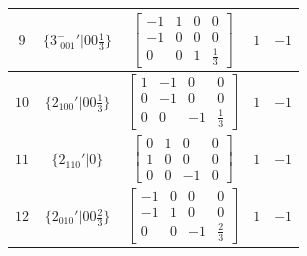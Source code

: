 \documentclass[fleqn,8pt]{jsarticle}
\begin{document}
\begin{longtable}{ccccc}
$ 9 $ & $ \{3^{-}_{\,\,001}{}'|0 0 \frac{1}{3}\} $ & $ \begin{bmatrix} -1 & 1 & 0 & 0 \\ -1 & 0 & 0 & 0 \\ 0 & 0 & 1 & \frac{1}{3} \end{bmatrix} $ & $ 1 $ & $ -1 $ \\ \hline
$ 10 $ & $ \{2{}_{100}{}'|0 0 \frac{1}{3}\} $ & $ \begin{bmatrix} 1 & -1 & 0 & 0 \\ 0 & -1 & 0 & 0 \\ 0 & 0 & -1 & \frac{1}{3} \end{bmatrix} $ & $ 1 $ & $ -1 $ \\ \hline
$ 11 $ & $ \{2{}_{110}{}'|0\} $ & $ \begin{bmatrix} 0 & 1 & 0 & 0 \\ 1 & 0 & 0 & 0 \\ 0 & 0 & -1 & 0 \end{bmatrix} $ & $ 1 $ & $ -1 $ \\ \hline
$ 12 $ & $ \{2{}_{010}{}'|0 0 \frac{2}{3}\} $ & $ \begin{bmatrix} -1 & 0 & 0 & 0 \\ -1 & 1 & 0 & 0 \\ 0 & 0 & -1 & \frac{2}{3} \end{bmatrix} $ & $ 1 $ & $ -1 $ \\
\end{longtable}
\end{document}

